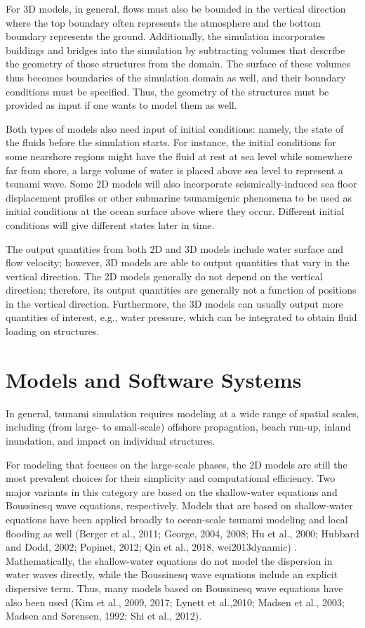 For 3D models, in general, flows must also be bounded in the vertical direction where the top boundary often represents the atmosphere and the bottom boundary represents the ground. Additionally, the simulation incorporates buildings and bridges into the simulation by subtracting volumes that describe the geometry of those structures from the domain. The surface of these volumes thus becomes boundaries of the simulation domain as well, and their boundary conditions must be specified. Thus, the geometry of the structures must be provided as input if one wants to model them as well.

Both types of models also need input of initial conditions: namely, the state of the fluids before the simulation starts. For instance, the initial conditions for some nearshore regions might have the fluid at rest at sea level while somewhere far from shore, a large volume of water is placed above sea level to represent a tsunami wave. Some 2D models will also incorporate seismically-induced sea floor displacement profiles or other submarine tsunamigenic phenomena to be used as initial conditions at the ocean surface above where they occur.  Different initial conditions will give different states later in time.

The output quantities from both 2D and 3D models include water surface and flow velocity; however, 3D models are able to output quantities that vary in the vertical direction. The 2D models generally do not depend on the vertical direction; therefore, its output quantities are generally not a function of positions in the vertical direction. Furthermore, the 3D models can usually output more quantities of interest, e.g., water pressure, which can be integrated to obtain fluid loading on structures.

\section{Models and Software Systems}
\label{sec:tsunami_tools}

In general, tsunami simulation requires modeling at a wide range of spatial scales, including (from large- to small-scale) offshore propagation, beach run-up, inland inundation, and impact on individual structures.

For modeling that focuses on the large-scale phases, the 2D models are still the most prevalent choices for their simplicity and computational efficiency. Two major variants in this category are based on the shallow-water equations and Boussinesq wave equations, respectively. Models that are based on shallow-water equations have been applied broadly to ocean-scale tsunami modeling and local flooding as well (Berger et al., 2011; George, 2004, 2008; Hu et al., 2000; Hubbard and Dodd, 2002; Popinet, 2012; Qin et al., 2018, wei2013dynamic) . Mathematically, the shallow-water equations do not model the dispersion in water waves directly, while the Boussinesq wave equations include an explicit dispersive term. Thus, many models based on Boussinesq wave equations have also been used (Kim et al., 2009, 2017; Lynett et al.,2010; Madsen et al., 2003; Madsen and Sørensen, 1992; Shi et al., 2012). 

